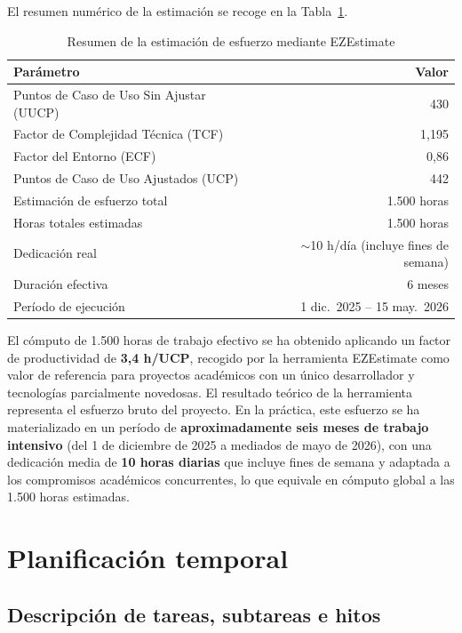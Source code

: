 \documentclass[11pt, a4paper]{article}
\begin{document}
El resumen numérico de la estimación se recoge en la Tabla~\ref{tab:estimacion-final}.
\begin{table}[H]
\centering
\begin{tabular}{|l|r|}
\hline
\textbf{Parámetro} & \textbf{Valor} \\
\hline
Puntos de Caso de Uso Sin Ajustar (UUCP) & 430 \\
\hline
Factor de Complejidad Técnica (TCF) & 1{,}195 \\
\hline
Factor del Entorno (ECF) & 0{,}86 \\
\hline
Puntos de Caso de Uso Ajustados (UCP) & 442 \\
\hline
Estimación de esfuerzo total & 1.500 horas \\
\hline
Horas totales estimadas & 1.500 horas \\
\hline
Dedicación real & $\sim$10 h/día (incluye fines de semana) \\
\hline
Duración efectiva & 6 meses \\
\hline
Período de ejecución & 1 dic.\ 2025 -- 15 may.\ 2026 \\
\hline
\end{tabular}
\caption{Resumen de la estimación de esfuerzo mediante EZEstimate}\label{tab:estimacion-final}
\end{table}

El cómputo de 1.500 horas de trabajo efectivo se ha obtenido aplicando un factor de productividad de \textbf{3,4 h/UCP}, recogido por la herramienta EZEstimate como valor de referencia para proyectos académicos con un único desarrollador y tecnologías parcialmente novedosas. El resultado teórico de la herramienta representa el esfuerzo bruto del proyecto. En la práctica, este esfuerzo se ha materializado en un período de \textbf{aproximadamente seis meses de trabajo intensivo} (del 1 de diciembre de 2025 a mediados de mayo de 2026), con una dedicación media de \textbf{10 horas diarias} que incluye fines de semana y adaptada a los compromisos académicos concurrentes, lo que equivale en cómputo global a las 1.500 horas estimadas.

\section{Planificación temporal}

\subsection{Descripción de tareas, subtareas e hitos}
\end{document}

